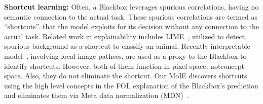 \textbf{Shortcut learning:}
Often, a Blackbox leverages spurious correlations, having no semantic connection to the actual task. These spurious correlations are termed as ``shortcuts''.  that the model exploits for its decision without any connection to the actual task. Related work in explainability includes LIME~\cite{ribeiro2016should}, utilized to detect spurious background as a shortcut to classify an animal. Recently interpretable model~\cite{rosenzweig2021patch}, involving local image pathces, are used as a proxy to the Blackbox to identify shortcuts. However, both of them function in pixel space, notconcept space. Also, they do not eliminate the shortcut.  Our MoIE discovers shortcuts using the high level concepts in the FOL explanation of the Blackbox's prediction and eliminates them via Meta data normalization (MDN)~\cite{lu2021metadata}.